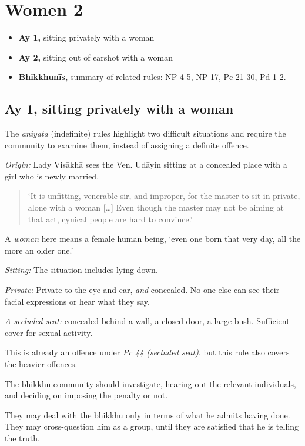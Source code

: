 \chapter{Women 2}

\begin{itemize}
\tightlist
\item
  \textbf{Ay 1,} sitting privately with a woman
\item
  \textbf{Ay 2,} sitting out of earshot with a woman
\item
  \textbf{Bhikkhunīs,} summary of related rules: NP 4-5, NP 17, Pc
  21-30, Pd 1-2.
\end{itemize}

\section{Ay 1, sitting privately with a woman}

The \emph{aniyata} (indefinite) rules highlight two difficult situations
and require the community to examine them, instead of assigning a
definite offence.

\emph{Origin:} Lady Visākhā sees the Ven. Udāyin sitting at a concealed
place with a girl who is newly married.

\begin{quote}
`It is unfitting, venerable sir, and improper, for the master to sit in
private, alone with a woman {[}\ldots{]} Even though the master may not
be aiming at that act, cynical people are hard to convince.'
\end{quote}

A \emph{woman} here means a female human being, `even one born that very
day, all the more an older one.'

\emph{Sitting:} The situation includes lying down.

\emph{Private:} Private to the eye and ear, \emph{and} concealed. No one
else can see their facial expressions or hear what they say.

\emph{A secluded seat:} concealed behind a wall, a closed door, a large
bush. Sufficient cover for sexual activity.

This is already an offence under \emph{Pc 44 (secluded seat)}, but this
rule also covers the heavier offences.

The bhikkhu community should investigate, hearing out the relevant
individuals, and deciding on imposing the penalty or not.

They may deal with the bhikkhu only in terms of what he admits having
done. They may cross-question him as a group, until they are satisfied
that he is telling the truth.

